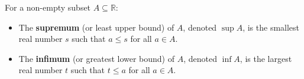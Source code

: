 For a non-empty subset $A \subseteq \mathbb{R}$:
\begin{itemize}
\item The \textbf{supremum} (or least upper bound) of $A$, denoted $\sup A$, is the smallest real number $s$ such that $a \leq s$ for all $a \in A$.
\item The \textbf{infimum} (or greatest lower bound) of $A$, denoted $\inf A$, is the largest real number $t$ such that $t \leq a$ for all $a \in A$.
\end{itemize}
